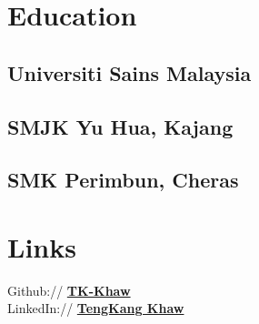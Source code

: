\documentclass[letterpaper]{deedy-resume} %
\begin{document}
\begin{minipage}[t]{0.33\textwidth} %


\section{Education} 

\subsection{Universiti Sains Malaysia}
\sectionspace %


\subsection{SMJK Yu Hua, Kajang}
\sectionspace %

\subsection{SMK Perimbun, Cheras}
\sectionspace



\section{Links} 

Github:// \href{https://github.com/TK-Khaw}{\bf TK-Khaw} \\
LinkedIn:// \href{https://www.linkedin.com/in/teng-kang-khaw-326657132/}{\bf TengKang Khaw} \\

\sectionspace %



\end{minipage}
\end{document}
